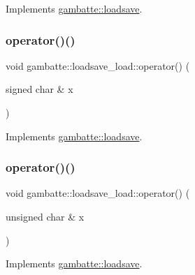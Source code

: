 Implements \hyperlink{classgambatte_1_1loadsave_a286a1bc924db345dda227a735a5ba038}{gambatte\+::loadsave}.

\mbox{\label{classgambatte_1_1loadsave__load_ae0135e997f4fac56481edb91a3b4e6c0}} 
\subsubsection{\texorpdfstring{operator()()}{operator()()}\hspace{0.1cm}{\footnotesize\ttfamily [2/19]}}
{\footnotesize\ttfamily void gambatte\+::loadsave\+\_\+load\+::operator() (\begin{DoxyParamCaption}\item[{signed char \&}]{x }\end{DoxyParamCaption})\hspace{0.3cm}{\ttfamily [virtual]}}



Implements \hyperlink{classgambatte_1_1loadsave_abe43ebb74162f066b542781f5ec7e5af}{gambatte\+::loadsave}.

\mbox{\label{classgambatte_1_1loadsave__load_a1e6642fca66ae4b43af93815c69d5aba}} 
\subsubsection{\texorpdfstring{operator()()}{operator()()}\hspace{0.1cm}{\footnotesize\ttfamily [3/19]}}
{\footnotesize\ttfamily void gambatte\+::loadsave\+\_\+load\+::operator() (\begin{DoxyParamCaption}\item[{unsigned char \&}]{x }\end{DoxyParamCaption})\hspace{0.3cm}{\ttfamily [virtual]}}



Implements \hyperlink{classgambatte_1_1loadsave_a475286c3cdfc0a207cd6ac9d27bf5b0b}{gambatte\+::loadsave}.

